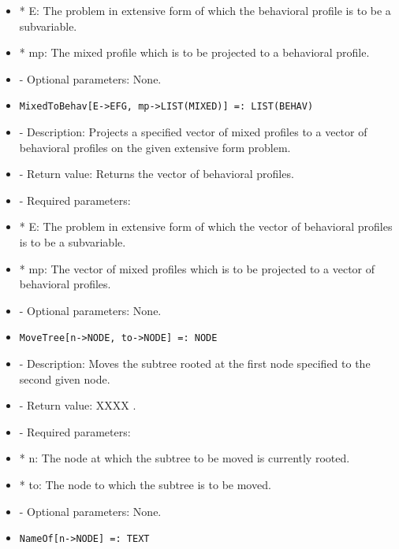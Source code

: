 \begin{itemize}
\bd
\item
*  E:  The problem in extensive form of which the behavioral profile
is to be a subvariable.
\item
*  mp:  The mixed profile which is to be projected to a behavioral
profile.
\ed

\item
- Optional parameters:  None.
\ed

\item
\begin{verbatim}
MixedToBehav[E->EFG, mp->LIST(MIXED)] =: LIST(BEHAV)
\end{verbatim}

\bd
\item
- Description:  Projects a specified vector of mixed profiles to a vector
of behavioral profiles on the given extensive form problem.
\item
- Return value:  Returns the vector of behavioral profiles.
\item
- Required parameters:

\bd
\item
*  E:  The problem in extensive form of which the vector of 
behavioral profiles is to be a subvariable.
\item
*  mp:  The vector of mixed profiles which is to be projected to a 
vector of behavioral profiles.
\ed

\item
- Optional parameters:  None.
\ed

\item
\begin{verbatim}
MoveTree[n->NODE, to->NODE] =: NODE
\end{verbatim}

\bd
\item
- Description:  Moves the subtree rooted at the first node specified to
the second given node.
\item
- Return value:  XXXX .
\item
- Required parameters:
	  
\bd
\item
*  n:  The node at which the subtree to be moved is currently rooted.
\item
*  to:  The node to which the subtree is to be moved.
\ed

\item
- Optional parameters:  None.
\ed

\item
\begin{verbatim}
NameOf[n->NODE] =: TEXT
\end{verbatim}


\end{itemize}
